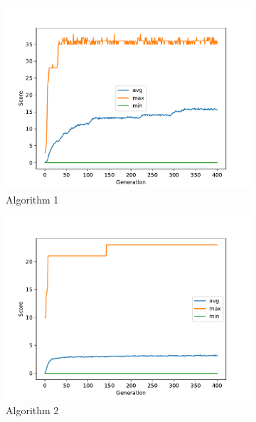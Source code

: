 \documentclass[12pt,a4paper]{article}
\begin{document}
		\begin{figure}[h!]
			\begin{subfigure}{.33\textwidth}
				\centering
				\includegraphics[width=\linewidth]{../code/plots/alg1_score}
				\caption{Algorithm 1}
				\label{fig:alg1_score}
			\end{subfigure}
			\begin{subfigure}{.33\textwidth}
				\centering
				\includegraphics[width=\linewidth]{../code/plots/alg2_score}
				\caption{Algorithm 2}
				\label{fig:alg2_score}
			\end{subfigure}
			\begin{subfigure}{.33\textwidth}
				\centering

\end{subfigure}
\end{figure}
\end{document}
